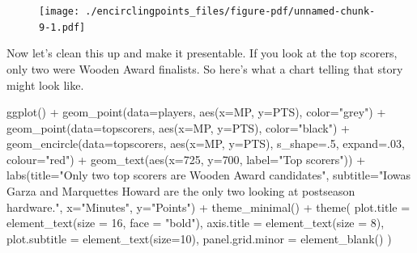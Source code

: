 \documentclass[
  letterpaper,
  DIV=11,
  numbers=noendperiod]{scrreprt}
\newenvironment{Shaded}{\begin{snugshade}}{\end{snugshade}}
\newcommand{\AttributeTok}[1]{\textcolor[rgb]{0.40,0.45,0.13}{#1}}
\newcommand{\DecValTok}[1]{\textcolor[rgb]{0.68,0.00,0.00}{#1}}
\newcommand{\FunctionTok}[1]{\textcolor[rgb]{0.28,0.35,0.67}{#1}}
\newcommand{\NormalTok}[1]{\textcolor[rgb]{0.00,0.23,0.31}{#1}}
\newcommand{\SpecialCharTok}[1]{\textcolor[rgb]{0.37,0.37,0.37}{#1}}
\newcommand{\StringTok}[1]{\textcolor[rgb]{0.13,0.47,0.30}{#1}}
\begin{document}
\begin{figure}[H]

{\centering \texttt{[image: ./encirclingpoints\_files/figure-pdf/unnamed-chunk-9-1.pdf]}

}

\end{figure}

Now let's clean this up and make it presentable. If you look at the top
scorers, only two were Wooden Award finalists. So here's what a chart
telling that story might look like.

\begin{Shaded}
\begin{Highlighting}[]
\FunctionTok{ggplot}\NormalTok{() }\SpecialCharTok{+} 
  \FunctionTok{geom\_point}\NormalTok{(}\AttributeTok{data=}\NormalTok{players, }\FunctionTok{aes}\NormalTok{(}\AttributeTok{x=}\NormalTok{MP, }\AttributeTok{y=}\NormalTok{PTS), }\AttributeTok{color=}\StringTok{"grey"}\NormalTok{) }\SpecialCharTok{+} 
  \FunctionTok{geom\_point}\NormalTok{(}\AttributeTok{data=}\NormalTok{topscorers, }\FunctionTok{aes}\NormalTok{(}\AttributeTok{x=}\NormalTok{MP, }\AttributeTok{y=}\NormalTok{PTS), }\AttributeTok{color=}\StringTok{"black"}\NormalTok{) }\SpecialCharTok{+} 
  \FunctionTok{geom\_encircle}\NormalTok{(}\AttributeTok{data=}\NormalTok{topscorers, }\FunctionTok{aes}\NormalTok{(}\AttributeTok{x=}\NormalTok{MP, }\AttributeTok{y=}\NormalTok{PTS), }\AttributeTok{s\_shape=}\NormalTok{.}\DecValTok{5}\NormalTok{, }\AttributeTok{expand=}\NormalTok{.}\DecValTok{03}\NormalTok{, }\AttributeTok{colour=}\StringTok{"red"}\NormalTok{) }\SpecialCharTok{+}
  \FunctionTok{geom\_text}\NormalTok{(}\FunctionTok{aes}\NormalTok{(}\AttributeTok{x=}\DecValTok{725}\NormalTok{, }\AttributeTok{y=}\DecValTok{700}\NormalTok{, }\AttributeTok{label=}\StringTok{"Top scorers"}\NormalTok{)) }\SpecialCharTok{+} 
  \FunctionTok{labs}\NormalTok{(}\AttributeTok{title=}\StringTok{"Only two top scorers are Wooden Award candidates"}\NormalTok{, }\AttributeTok{subtitle=}\StringTok{"Iowa\textquotesingle{}s Garza and Marquette\textquotesingle{}s Howard are the only two looking at postseason hardware."}\NormalTok{, }\AttributeTok{x=}\StringTok{"Minutes"}\NormalTok{, }\AttributeTok{y=}\StringTok{"Points"}\NormalTok{) }\SpecialCharTok{+} 
  \FunctionTok{theme\_minimal}\NormalTok{() }\SpecialCharTok{+} 
  \FunctionTok{theme}\NormalTok{(}
    \AttributeTok{plot.title =} \FunctionTok{element\_text}\NormalTok{(}\AttributeTok{size =} \DecValTok{16}\NormalTok{, }\AttributeTok{face =} \StringTok{"bold"}\NormalTok{),}
    \AttributeTok{axis.title =} \FunctionTok{element\_text}\NormalTok{(}\AttributeTok{size =} \DecValTok{8}\NormalTok{), }
    \AttributeTok{plot.subtitle =} \FunctionTok{element\_text}\NormalTok{(}\AttributeTok{size=}\DecValTok{10}\NormalTok{), }
    \AttributeTok{panel.grid.minor =} \FunctionTok{element\_blank}\NormalTok{()}
\NormalTok{    )}
\end{Highlighting}
\end{Shaded}
\end{document}
